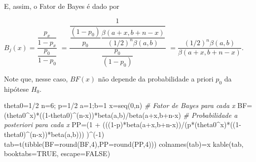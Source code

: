 \documentclass[
]{book}
\newenvironment{Shaded}{\begin{snugshade}}{\end{snugshade}}
\newcommand{\AttributeTok}[1]{\textcolor[rgb]{0.77,0.63,0.00}{#1}}
\newcommand{\CommentTok}[1]{\textcolor[rgb]{0.56,0.35,0.01}{\textit{#1}}}
\newcommand{\ConstantTok}[1]{\textcolor[rgb]{0.00,0.00,0.00}{#1}}
\newcommand{\DecValTok}[1]{\textcolor[rgb]{0.00,0.00,0.81}{#1}}
\newcommand{\FunctionTok}[1]{\textcolor[rgb]{0.00,0.00,0.00}{#1}}
\newcommand{\NormalTok}[1]{#1}
\newcommand{\OtherTok}[1]{\textcolor[rgb]{0.56,0.35,0.01}{#1}}
\newcommand{\SpecialCharTok}[1]{\textcolor[rgb]{0.00,0.00,0.00}{#1}}
\begin{document}
E, assim, o Fator de Bayes é dado por

\(B_j(x)=\dfrac{\dfrac{p_x}{1-p_x}}{\dfrac{p_0}{1-p_0}}\) \(=\dfrac{\dfrac{1}{\dfrac{(1-p_0)}{p_0}\dfrac{\beta(a+x,b+n-x)}{(1/2)^n\beta(a,b)}}}{\dfrac{p_0}{(1-p_0)}}\)
\(=\dfrac{(1/2)^n\beta(a,b)}{\beta(a+x,b+n-x)}\).

Note que, nesse caso, \(BF(x)\) não depende da probabilidade a priori \(p_0\) da hipótese \(H_0\).

\begin{Shaded}
\begin{Highlighting}[]
\NormalTok{theta0}\OtherTok{=}\DecValTok{1}\SpecialCharTok{/}\DecValTok{2}
\NormalTok{n}\OtherTok{=}\DecValTok{6}\NormalTok{; p}\OtherTok{=}\DecValTok{1}\SpecialCharTok{/}\DecValTok{2}
\NormalTok{a}\OtherTok{=}\DecValTok{1}\NormalTok{;b}\OtherTok{=}\DecValTok{1}
\NormalTok{x}\OtherTok{=}\FunctionTok{seq}\NormalTok{(}\DecValTok{0}\NormalTok{,n)}
\CommentTok{\# Fator de Bayes para cada x}
\NormalTok{BF}\OtherTok{=}\NormalTok{(theta0}\SpecialCharTok{\^{}}\NormalTok{x)}\SpecialCharTok{*}\NormalTok{((}\DecValTok{1}\SpecialCharTok{{-}}\NormalTok{theta0)}\SpecialCharTok{\^{}}\NormalTok{(n}\SpecialCharTok{{-}}\NormalTok{x))}\SpecialCharTok{*}\FunctionTok{beta}\NormalTok{(a,b)}\SpecialCharTok{/}\FunctionTok{beta}\NormalTok{(a}\SpecialCharTok{+}\NormalTok{x,b}\SpecialCharTok{+}\NormalTok{n}\SpecialCharTok{{-}}\NormalTok{x)}
\CommentTok{\# Probabilidade a posteriori para cada x}
\NormalTok{PP}\OtherTok{=}\NormalTok{(}\DecValTok{1} \SpecialCharTok{+}\NormalTok{ (((}\DecValTok{1}\SpecialCharTok{{-}}\NormalTok{p)}\SpecialCharTok{*}\FunctionTok{beta}\NormalTok{(a}\SpecialCharTok{+}\NormalTok{x,b}\SpecialCharTok{+}\NormalTok{n}\SpecialCharTok{{-}}\NormalTok{x))}\SpecialCharTok{/}\NormalTok{(p}\SpecialCharTok{*}\NormalTok{(theta0}\SpecialCharTok{\^{}}\NormalTok{x)}\SpecialCharTok{*}\NormalTok{((}\DecValTok{1}\SpecialCharTok{{-}}\NormalTok{theta0)}\SpecialCharTok{\^{}}\NormalTok{(n}\SpecialCharTok{{-}}\NormalTok{x))}\SpecialCharTok{*}\FunctionTok{beta}\NormalTok{(a,b)))  )}\SpecialCharTok{\^{}}\NormalTok{(}\SpecialCharTok{{-}}\DecValTok{1}\NormalTok{)}
\NormalTok{tab}\OtherTok{=}\FunctionTok{t}\NormalTok{(}\FunctionTok{tibble}\NormalTok{(}\AttributeTok{BF=}\FunctionTok{round}\NormalTok{(BF,}\DecValTok{4}\NormalTok{),}\AttributeTok{PP=}\FunctionTok{round}\NormalTok{(PP,}\DecValTok{4}\NormalTok{)))}
\FunctionTok{colnames}\NormalTok{(tab)}\OtherTok{=}\NormalTok{x}
\FunctionTok{kable}\NormalTok{(tab, }\AttributeTok{booktabs=}\ConstantTok{TRUE}\NormalTok{, }\AttributeTok{escape=}\ConstantTok{FALSE}\NormalTok{)}
\end{Highlighting}
\end{Shaded}
\end{document}
